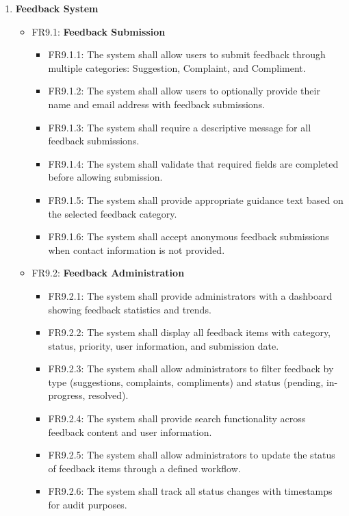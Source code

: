 \documentclass[12pt]{article}
\begin{document}
\begin{enumerate}[label=FR\arabic*:, leftmargin=2.5em]
    \item \textbf{Feedback System}
    \begin{itemize}
        \item FR9.1: \textbf{Feedback Submission}
        \begin{itemize}
            \item FR9.1.1: The system shall allow users to submit feedback through multiple categories: Suggestion, Complaint, and Compliment.
            \item FR9.1.2: The system shall allow users to optionally provide their name and email address with feedback submissions.
            \item FR9.1.3: The system shall require a descriptive message for all feedback submissions.
            \item FR9.1.4: The system shall validate that required fields are completed before allowing submission.
            \item FR9.1.5: The system shall provide appropriate guidance text based on the selected feedback category.
            \item FR9.1.6: The system shall accept anonymous feedback submissions when contact information is not provided.
        \end{itemize}
        \item FR9.2: \textbf{Feedback Administration}
        \begin{itemize}
            \item FR9.2.1: The system shall provide administrators with a dashboard showing feedback statistics and trends.
            \item FR9.2.2: The system shall display all feedback items with category, status, priority, user information, and submission date.
            \item FR9.2.3: The system shall allow administrators to filter feedback by type (suggestions, complaints, compliments) and status (pending, in-progress, resolved).
            \item FR9.2.4: The system shall provide search functionality across feedback content and user information.
            \item FR9.2.5: The system shall allow administrators to update the status of feedback items through a defined workflow.
            \item FR9.2.6: The system shall track all status changes with timestamps for audit purposes.
        \end{itemize}
    \end{itemize}


\end{enumerate}
\end{document}
